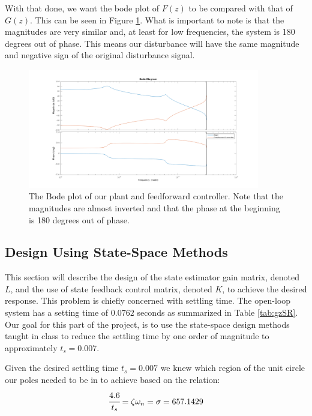\documentclass[11pt]{article}
\begin{document}
With that done, we want the bode plot of $F(z)$ to be compared with that of $G(z)$. This can be seen in Figure \ref{fig:FZGZ}. What is important to note is that the magnitudes are very similar and, at least for low frequencies, the system is 180 degrees out of phase. This means our disturbance will have the same magnitude and negative sign of the original disturbance signal.
\begin{figure}[H]
    \centering
    \includegraphics[width=0.9\textwidth]{bode_GZ_Fz.png}
    \caption{The Bode plot of our plant and feedforward controller. Note that the magnitudes are almost inverted and that the phase at the beginning is 180 degrees out of phase.}
    \label{fig:FZGZ}
\end{figure}
\subsection{Design Using State-Space Methods}
This section will describe the design of the state estimator gain matrix, denoted $L$, and the use of state feedback control matrix, denoted $K$, to achieve the desired response. This problem is chiefly concerned with settling time. The open-loop system has a setting time of $0.0762$ seconds as summarized in Table \ref{tab:gzSR}. Our goal for this part of the project, is to use the state-space design methods taught in class to reduce the settling time by one order of magnitude to approximately $t_{s} = 0.007$. 

Given the desired settling time $t_s=0.007$ we knew which region of the unit circle our poles needed to be in to achieve based on the relation:
\[\cfrac{4.6}{t_s}=\zeta\omega_n=\sigma=657.1429\]
\end{document}
